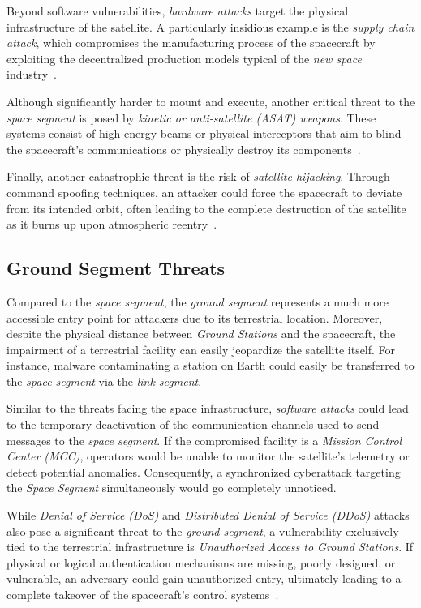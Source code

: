 \documentclass[11pt,a4paper]{report}
\begin{document}
Beyond software vulnerabilities, \textit{hardware attacks} target the physical infrastructure of the satellite. 
A particularly insidious example is the \textit{supply chain attack}, which compromises the manufacturing process of the spacecraft by exploiting the decentralized production models typical of the \textit{new space} industry~\cite[p. 386--389]{aLotOfReferences}. 

Although significantly harder to mount and execute, another critical threat to the \textit{space segment} is posed by \textit{kinetic or anti-satellite (ASAT) weapons}. 
These systems consist of high-energy beams or physical interceptors that aim to blind the spacecraft's communications or physically destroy its components~\cite[p. 5677]{LEO_MEO_GEO}.

Finally, another catastrophic threat is the risk of \textit{satellite hijacking}. 
Through command spoofing techniques, an attacker could force the spacecraft to deviate from its intended orbit, often leading to the complete destruction of the satellite as it burns up upon atmospheric reentry~\cite[p. 386--389]{aLotOfReferences}.

\subsection{Ground Segment Threats}
Compared to the \textit{space segment}, the \textit{ground segment} represents a much more accessible entry point for attackers due to its terrestrial location.
Moreover, despite the physical distance between \textit{Ground Stations} and the spacecraft, the impairment of a terrestrial facility can easily jeopardize the satellite itself. 
For instance, malware contaminating a station on Earth could easily be transferred to the \textit{space segment} via the \textit{link segment}.

Similar to the threats facing the space infrastructure, \textit{software attacks} could lead to the temporary deactivation of the communication channels used to send messages to the \textit{space segment}. 
If the compromised facility is a \textit{Mission Control Center (MCC)}, operators would be unable to monitor the satellite's telemetry or detect potential anomalies. 
Consequently, a synchronized cyberattack targeting the \textit{Space Segment} simultaneously would go completely unnoticed.

While \textit{Denial of Service (DoS)} and \textit{Distributed Denial of Service (DDoS)} attacks also pose a significant threat to the \textit{ground segment}, 
a vulnerability exclusively tied to the terrestrial infrastructure is \textit{Unauthorized Access to Ground Stations}. 
If physical or logical authentication mechanisms are missing, poorly designed, or vulnerable, an adversary could gain unauthorized entry, ultimately leading to a complete takeover of the spacecraft's control systems~\cite[p. 389--391]{aLotOfReferences}.
\end{document}
